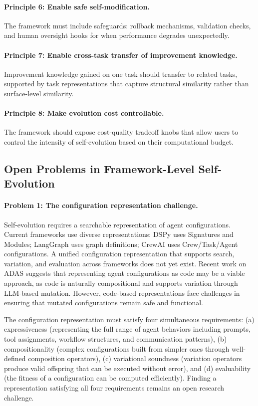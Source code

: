 \paragraph{Principle 6: Enable safe self-modification.}
The framework must include safeguards: rollback mechanisms, validation checks, and human oversight hooks for when performance degrades unexpectedly.

\paragraph{Principle 7: Enable cross-task transfer of improvement knowledge.}
Improvement knowledge gained on one task should transfer to related tasks, supported by task representations that capture structural similarity rather than surface-level similarity.

\paragraph{Principle 8: Make evolution cost controllable.}
The framework should expose cost-quality tradeoff knobs that allow users to control the intensity of self-evolution based on their computational budget.


\subsection{Open Problems in Framework-Level Self-Evolution}

\paragraph{Problem 1: The configuration representation challenge.}
Self-evolution requires a searchable representation of agent configurations. Current frameworks use diverse representations: DSPy uses Signatures and Modules; LangGraph uses graph definitions; CrewAI uses Crew/Task/Agent configurations. A unified configuration representation that supports search, variation, and evaluation across frameworks does not yet exist. Recent work on ADAS suggests that representing agent configurations as code may be a viable approach, as code is naturally compositional and supports variation through LLM-based mutation. However, code-based representations face challenges in ensuring that mutated configurations remain safe and functional.

The configuration representation must satisfy four simultaneous requirements: (a) expressiveness (representing the full range of agent behaviors including prompts, tool assignments, workflow structures, and communication patterns), (b) compositionality (complex configurations built from simpler ones through well-defined composition operators), (c) variational soundness (variation operators produce valid offspring that can be executed without error), and (d) evaluability (the fitness of a configuration can be computed efficiently). Finding a representation satisfying all four requirements remains an open research challenge.

